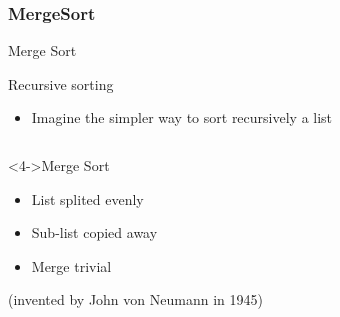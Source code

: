 \subsubsection{MergeSort}
\begin{frame}{Merge Sort}
  \begin{block}{Recursive sorting}
    \begin{itemize}
    \item Imagine the simpler way to sort recursively a list
    \end{itemize}
  \end{block}

  \begin{columns}
    \begin{column}{.55\linewidth}
      \begin{block}<4->{Merge Sort}
        \begin{itemize}
        \item List splited evenly
        \item Sub-list copied away
        \item Merge trivial
        \end{itemize}        
        (invented by John von Neumann in 1945)
      \end{block}      
    \end{column}
    \begin{column}{.4\linewidth}
    \end{column}
  \end{columns}
\end{frame}
